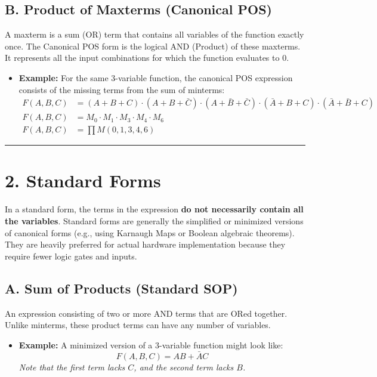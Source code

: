 \documentclass[12pt,a3paper]{article}
\begin{document}
\begin{enumerate}
\begin{tcolorbox}[enhanced,breakable,ansbox,colback=cB!4,colframe=cB,boxrule=0.8pt,arc=5pt,title={\textbf{Answer}},fonttitle=\bfseries\color{white},colbacktitle=cB]
\subsection*{B. Product of Maxterms (Canonical POS)}
A maxterm is a sum (OR) term that contains all variables of the function exactly once. The Canonical POS form is the logical AND (Product) of these maxterms. It represents all the input combinations for which the function evaluates to $0$.
\begin{itemize}
    \item \textbf{Example:} For the same 3-variable function, the canonical POS expression consists of the missing terms from the sum of minterms:
    \begin{align*}
        F(A, B, C) &= (A+B+C) \cdot (A+B+\bar{C}) \cdot (A+\bar{B}+\bar{C}) \cdot (\bar{A}+B+C) \cdot (\bar{A}+\bar{B}+C) \\
        F(A, B, C) &= M_0 \cdot M_1 \cdot M_3 \cdot M_4 \cdot M_6 \\
        F(A, B, C) &= \prod M(0, 1, 3, 4, 6)
    \end{align*}
\end{itemize}

\vspace{0.2cm}
\hrule
\vspace{0.4cm}

\section*{2. Standard Forms}

In a standard form, the terms in the expression \textbf{do not necessarily contain all the variables}. Standard forms are generally the simplified or minimized versions of canonical forms (e.g., using Karnaugh Maps or Boolean algebraic theorems). They are heavily preferred for actual hardware implementation because they require fewer logic gates and inputs.

\subsection*{A. Sum of Products (Standard SOP)}
An expression consisting of two or more AND terms that are ORed together. Unlike minterms, these product terms can have any number of variables.
\begin{itemize}
    \item \textbf{Example:} A minimized version of a 3-variable function might look like:
    \begin{equation*}
        F(A, B, C) = AB + \bar{A}C
    \end{equation*}
    \textit{Note that the first term lacks $C$, and the second term lacks $B$.}
\end{itemize}


\end{tcolorbox}
\end{enumerate}
\end{document}
